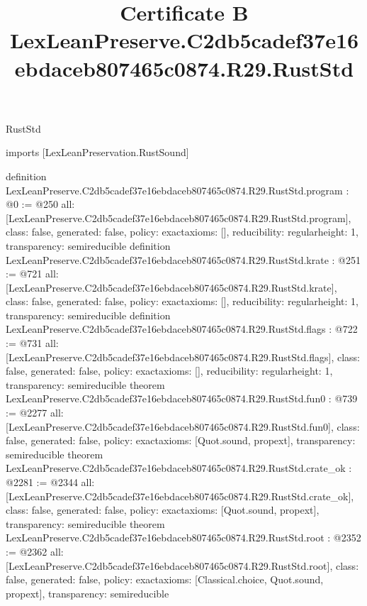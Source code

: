 \begin{lexlean}{RustStd}
\title{Certificate B LexLeanPreserve.C2db5cadef37e16ebdaceb807465c0874.R29.RustStd}
\begin{coremodule}
imports [LexLeanPreservation.RustSound]

definition LexLeanPreserve.C2db5cadef37e16ebdaceb807465c0874.R29.RustStd.program : @0 := @250 {
  all: [LexLeanPreserve.C2db5cadef37e16ebdaceb807465c0874.R29.RustStd.program],
  class: false,
  generated: false,
  policy: exact{axioms: []},
  reducibility: regular{height: 1},
  transparency: semireducible
}
definition LexLeanPreserve.C2db5cadef37e16ebdaceb807465c0874.R29.RustStd.krate : @251 := @721 {
  all: [LexLeanPreserve.C2db5cadef37e16ebdaceb807465c0874.R29.RustStd.krate],
  class: false,
  generated: false,
  policy: exact{axioms: []},
  reducibility: regular{height: 1},
  transparency: semireducible
}
definition LexLeanPreserve.C2db5cadef37e16ebdaceb807465c0874.R29.RustStd.flags : @722 := @731 {
  all: [LexLeanPreserve.C2db5cadef37e16ebdaceb807465c0874.R29.RustStd.flags],
  class: false,
  generated: false,
  policy: exact{axioms: []},
  reducibility: regular{height: 1},
  transparency: semireducible
}
theorem LexLeanPreserve.C2db5cadef37e16ebdaceb807465c0874.R29.RustStd.fun0 : @739 := @2277 {
  all: [LexLeanPreserve.C2db5cadef37e16ebdaceb807465c0874.R29.RustStd.fun0],
  class: false,
  generated: false,
  policy: exact{axioms: [Quot.sound, propext]},
  transparency: semireducible
}
theorem LexLeanPreserve.C2db5cadef37e16ebdaceb807465c0874.R29.RustStd.crate_ok : @2281 := @2344 {
  all: [LexLeanPreserve.C2db5cadef37e16ebdaceb807465c0874.R29.RustStd.crate_ok],
  class: false,
  generated: false,
  policy: exact{axioms: [Quot.sound, propext]},
  transparency: semireducible
}
theorem LexLeanPreserve.C2db5cadef37e16ebdaceb807465c0874.R29.RustStd.root : @2352 := @2362 {
  all: [LexLeanPreserve.C2db5cadef37e16ebdaceb807465c0874.R29.RustStd.root],
  class: false,
  generated: false,
  policy: exact{axioms: [Classical.choice, Quot.sound, propext]},
  transparency: semireducible
}


\end{coremodule}
\end{lexlean}
